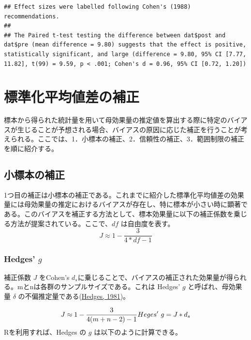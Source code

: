 \documentclass[
  ja=standard, xelatex, base=12pt]{bxjsreport}
\begin{document}
\begin{verbatim}
## Effect sizes were labelled following Cohen's (1988) recommendations.
## 
## The Paired t-test testing the difference between dat$post and dat$pre (mean difference = 9.80) suggests that the effect is positive, statistically significant, and large (difference = 9.80, 95% CI [7.77, 11.82], t(99) = 9.59, p < .001; Cohen's d = 0.96, 95% CI [0.72, 1.20])
\end{verbatim}

\hypertarget{ux6a19ux6e96ux5316ux5e73ux5747ux5024ux5deeux306eux88dcux6b63-1}{%
\section{標準化平均値差の補正}\label{ux6a19ux6e96ux5316ux5e73ux5747ux5024ux5deeux306eux88dcux6b63-1}}

標本から得られた統計量を用いて母効果量の推定値を算出する際に特定のバイアスが生じることが予想される場合、バイアスの原因に応じた補正を行うことが考えられる。ここでは、1．小標本の補正、2．信頼性の補正、3．範囲制限の補正を順に紹介する。

\hypertarget{ux5c0fux6a19ux672cux306eux88dcux6b63-1}{%
\subsection{小標本の補正}\label{ux5c0fux6a19ux672cux306eux88dcux6b63-1}}

1つ目の補正は小標本の補正である。これまでに紹介した標準化平均値差の効果量には母効果量の推定におけるバイアスが存在し、特に標本が小さい時に顕著である。このバイアスを補正する方法として、標本効果量に以下の補正係数を乗じる方法が提案されている。ここで、\(df\) は自由度を表す。 \[
J\approx1-\frac{3}{4*df-1}
\]

\hypertarget{hedges-g-1}{%
\subsubsection{\texorpdfstring{Hedges' \(g\)}{Hedges' g}}\label{hedges-g-1}}

補正係数 \(J\) をCohen's \(d_s\)に乗じることで、バイアスの補正された効果量が得られる。mとnは各群のサンプルサイズである。これは Hedges' \(g\) と呼ばれ、母効果量 \(\delta\) の不偏推定量である(\protect\hyperlink{ref-hedges1981}{Hedges, 1981})。

\[
J\approx1-\frac{3}{4(m+n-2)-1}\\
Heges'~g=J*d_s
\] Rを利用すれば、Hedges の \(g\) は以下のように計算できる。
\end{document}
